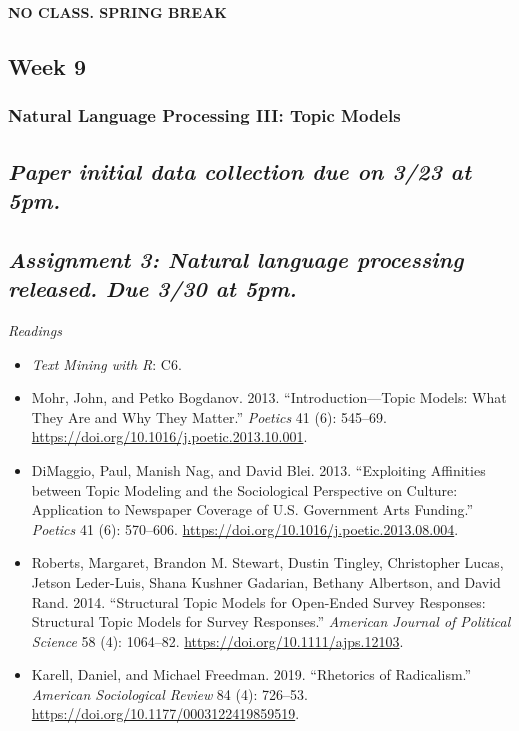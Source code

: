 \documentclass[
  10pt,
]{article}
\providecommand{\tightlist}{%
  \setlength{\itemsep}{0pt}\setlength{\parskip}{0pt}}
\begin{document}
\textbf{NO CLASS. SPRING BREAK}

\hypertarget{week-9}{%
\subsection{Week 9}\label{week-9}}

\hypertarget{natural-language-processing-iii-topic-models}{%
\subsubsection{Natural Language Processing III: Topic
Models}\label{natural-language-processing-iii-topic-models}}

\hypertarget{paper-initial-data-collection-due-on-323-at-5pm.}{%
\subsection{\texorpdfstring{\emph{Paper initial data collection due on
3/23 at
5pm.}}{Paper initial data collection due on 3/23 at 5pm.}}\label{paper-initial-data-collection-due-on-323-at-5pm.}}

\hypertarget{assignment-3-natural-language-processing-released.-due-330-at-5pm.}{%
\subsection{\texorpdfstring{\emph{Assignment 3: Natural language
processing released. Due 3/30 at
5pm.}}{Assignment 3: Natural language processing released. Due 3/30 at 5pm.}}\label{assignment-3-natural-language-processing-released.-due-330-at-5pm.}}

\emph{Readings}

\begin{itemize}
\tightlist
\item
  \emph{Text Mining with R}: C6.
\item
  Mohr, John, and Petko Bogdanov. 2013. ``Introduction---Topic Models:
  What They Are and Why They Matter.'' \emph{Poetics} 41 (6): 545--69.
  \url{https://doi.org/10.1016/j.poetic.2013.10.001}.
\item
  DiMaggio, Paul, Manish Nag, and David Blei. 2013. ``Exploiting
  Affinities between Topic Modeling and the Sociological Perspective on
  Culture: Application to Newspaper Coverage of U.S. Government Arts
  Funding.'' \emph{Poetics} 41 (6): 570--606.
  \url{https://doi.org/10.1016/j.poetic.2013.08.004}.
\item
  Roberts, Margaret, Brandon M. Stewart, Dustin Tingley, Christopher
  Lucas, Jetson Leder-Luis, Shana Kushner Gadarian, Bethany Albertson,
  and David Rand. 2014. ``Structural Topic Models for Open-Ended Survey
  Responses: Structural Topic Models for Survey Responses.''
  \emph{American Journal of Political Science} 58 (4): 1064--82.
  \url{https://doi.org/10.1111/ajps.12103}.
\item
  Karell, Daniel, and Michael Freedman. 2019. ``Rhetorics of
  Radicalism.'' \emph{American Sociological Review} 84 (4): 726--53.
  \url{https://doi.org/10.1177/0003122419859519}.
\end{itemize}
\end{document}
